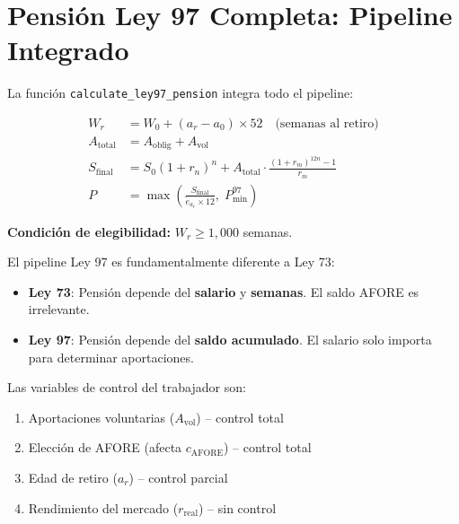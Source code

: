 \documentclass[11pt,a4paper]{report}
\theoremstyle{remark}
\begin{document}
\section{Pensi\'on Ley 97 Completa: Pipeline Integrado}

\begin{tcolorbox}[colback=blue!5!white, colframe=blue!75!black, title=\textbf{Definici\'on Formal}]
La funci\'on \texttt{calculate\_ley97\_pension} integra todo el pipeline:

\begin{align}
W_r &= W_0 + (a_r - a_0) \times 52 \quad \text{(semanas al retiro)} \label{eq:sem_retiro} \\
A_{\text{total}} &= A_{\text{oblig}} + A_{\text{vol}} \label{eq:aport_total} \\
S_{\text{final}} &= S_0 (1+r_n)^{n} + A_{\text{total}} \cdot \frac{(1+r_m)^{12n}-1}{r_m} \\
P &= \max\!\left(\frac{S_{\text{final}}}{\mathring{e}_{a_r} \times 12}, \; P_{\min}^{97}\right)
\end{align}

\textbf{Condici\'on de elegibilidad:} $W_r \geq 1{,}000$ semanas.
\end{tcolorbox}

\begin{tcolorbox}[colback=green!5!white, colframe=green!50!black, title=\textbf{Intuici\'on}]
El pipeline Ley 97 es fundamentalmente diferente a Ley 73:
\begin{itemize}
  \item \textbf{Ley 73}: Pensi\'on depende del \textbf{salario} y \textbf{semanas}. El saldo AFORE es irrelevante.
  \item \textbf{Ley 97}: Pensi\'on depende del \textbf{saldo acumulado}. El salario solo importa para determinar aportaciones.
\end{itemize}

Las variables de control del trabajador son:
\begin{enumerate}
  \item Aportaciones voluntarias ($A_{\text{vol}}$) -- control total
  \item Elecci\'on de AFORE (afecta $c_{\text{AFORE}}$) -- control total
  \item Edad de retiro ($a_r$) -- control parcial
  \item Rendimiento del mercado ($r_{\text{real}}$) -- sin control
\end{enumerate}
\end{tcolorbox}
\end{document}
